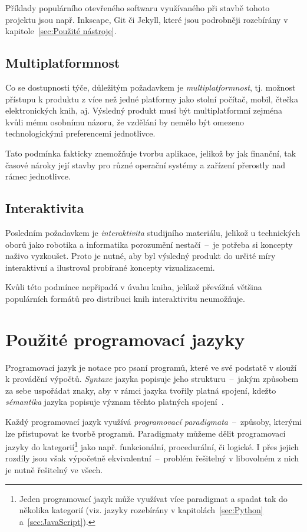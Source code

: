 \documentclass[a4paper, 12pt]{article}
\begin{document}
  Příklady populárního otevřeného softwaru využívaného při stavbě tohoto projektu jsou např. Inkscape, Git či Jekyll, které jsou podrobněji rozebírány v kapitole~\ref{sec:Použité nástroje}.


  \subsection{Multiplatformnost}
  Co se dostupnosti týče, důležitým požadavkem je \emph{multiplatformnost}, tj. možnost přístupu k produktu z více než jedné platformy jako stolní počítač, mobil, čtečka elektronických knih, aj. Výsledný produkt musí být multiplatformní zejména kvůli mému osobnímu názoru, že vzdělání by nemělo být omezeno technologickými preferencemi jednotlivce.

  Tato podmínka fakticky znemožňuje tvorbu aplikace, jelikož by jak finanční, tak časové nároky její stavby pro různé operační systémy a zařízení přerostly nad rámec jednotlivce.


  \subsection{Interaktivita}
  Posledním požadavkem je \emph{interaktivita} studijního materiálu, jelikož u technických oborů jako robotika a informatika porozumění nestačí~--~je potřeba si koncepty naživo vyzkoušet. Proto je nutné, aby byl výsledný produkt do určité míry interaktivní a ilustroval probírané koncepty vizualizacemi.

  Kvůli této podmínce nepřipadá v úvahu kniha, jelikož převážná většina populárních formátů pro distribuci knih interaktivitu neumožňuje.


  \section{Použité programovací jazyky} \label{sec:Použité programovací jazyky}
  Programovací jazyk je notace pro psaní programů, které ve své podstatě v slouží k provádění výpočtů. \emph{Syntaxe} jazyka popisuje jeho strukturu~--~jakým způsobem za sebe uspořádat znaky, aby v rámci jazyka tvořily platná spojení, kdežto \emph{sémantika} jazyka popisuje význam těchto platných spojení~\cite{intro-to-programming-languages}.

  Každý programovací jazyk využívá \emph{programovací paradigmata}~--~způsoby, kterými lze přistupovat ke tvorbě programů. Paradigmaty můžeme dělit programovací jazyky do kategorií\footnote{Jeden programovací jazyk může využívat více paradigmat a spadat tak do několika kategorií (viz. jazyky rozebírány v kapitolách~\ref{sec:Python} a~\ref{sec:JavaScript}).} jako např. funkcionální, procedurální, či logické. I přes jejich rozdíly jsou však výpočetně ekvivalentní~--~problém řešitelný v libovolném z nich je nutně řešitelný ve všech.
\end{document}
